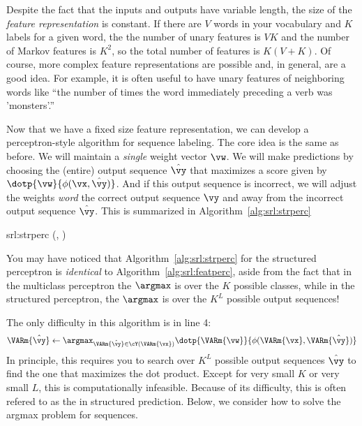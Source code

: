 Despite the fact that the inputs and outputs have variable length, the size of the \emph{feature representation} is constant.
If there are $V$ words in your vocabulary and $K$ labels for a given word, the the number of unary features is $VK$ and the number of Markov features is $K^2$, so the total number of features is $K(V+K)$.
Of course, more complex feature representations are possible and, in general, are a good idea.
For example, it is often useful to have unary features of neighboring words like ``the number of times the word immediately preceding a verb was 'monsters'.''

Now that we have a fixed size feature representation, we can develop a perceptron-style algorithm for sequence labeling.
The core idea is the same as before.
We will maintain a \emph{single} weight vector $\vw$.
We will make predictions by choosing the (entire) output sequence $\hat\vy$ that maximizes a score given by $\dotp{\vw}{\phi(\vx,\hat\vy)}$.
And if this output sequence is incorrect, we will adjust the weights \emph{word} the correct output sequence $\vy$ and away from the incorrect output sequence $\hat\vy$.
This is summarized in Algorithm~\ref{alg:srl:strperc}

\newalgorithm%
  {srl:strperc}%
  {(, )}
  {
        \SETST{$\hat \vy$}{$\argmax_{\VARm{\hat\vy} \in \cY(\VARm{\vx})} \dotp{\VARm{\vw}}{\phi(\VARm{\vx},\VARm{\hat\vy})}$}
        \IF{\VAR{$\hat \vy$} $\neq$ \VAR{$\vy$}}
          \SETST{$\vw$}{$\VARm{\vw} + \phi(\VARm{\vx}, \VARm{\vy}) - \phi(\VARm{\vx}, \VARm{\hat \vy})$}
        \ENDIF
      \ENDFOR
    \ENDFOR
    \RETURN \VAR{$\vw$}
  }

You may have noticed that Algorithm~\ref{alg:srl:strperc} for the structured perceptron is \emph{identical} to Algorithm~\ref{alg:srl:featperc}, aside from the fact that in the multiclass perceptron the $\argmax$ is over the $K$ possible classes, while in the structured perceptron, the $\argmax$ is over the $K^L$ possible output sequences!

The only difficulty in this algorithm is in line 4:
\begin{align}
\VARm{\hat \vy} \leftarrow \argmax_{\VARm{\hat\vy} \in \cY(\VARm{\vx})} \dotp{\VARm{\vw}}{\phi(\VARm{\vx},\VARm{\hat\vy})} \label{eq:srl:argmax}
\end{align}
In principle, this requires you to search over $K^L$ possible output sequences $\hat\vy$ to find the one that maximizes the dot product.
Except for very small $K$ or very small $L$, this is computationally infeasible.
Because of its difficulty, this is often refered to as the  in structured prediction.
Below, we consider how to solve the argmax problem for sequences.

